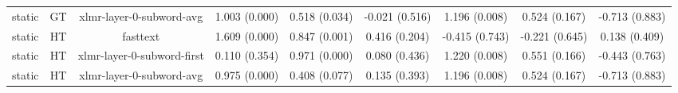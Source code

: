 \begin{sidewaystable}[htb]
\begin{tabular}{@{}ccccccccc@{}}
        static & GT & xlmr-layer-0-subword-avg & 1.003 (0.000) & 0.518 (0.034) & -0.021 (0.516) & 1.196 (0.008) & 0.524 (0.167) & -0.713 (0.883) \\
        static & HT & fasttext & 1.609 (0.000) & 0.847 (0.001) & 0.416 (0.204) & -0.415 (0.743) & -0.221 (0.645) & 0.138 (0.409) \\
        static & HT & xlmr-layer-0-subword-first & 0.110 (0.354) & 0.971 (0.000) & 0.080 (0.436) & 1.220 (0.008) & 0.551 (0.166) & -0.443 (0.763) \\
        static & HT & xlmr-layer-0-subword-avg & 0.975 (0.000) & 0.408 (0.077) & 0.135 (0.393) & 1.196 (0.008) & 0.524 (0.167) & -0.713 (0.883) \\
        \bottomrule
    \end{tabular}
\end{sidewaystable}